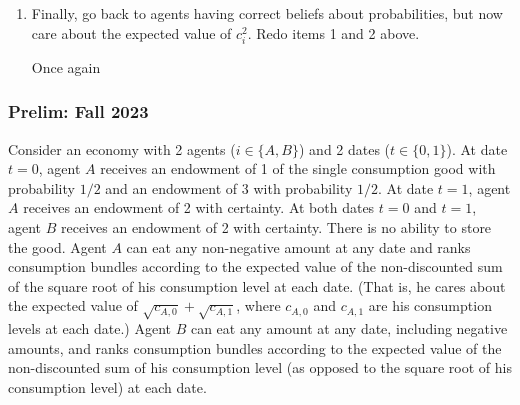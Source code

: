 \documentclass[11pt,english]{article}
\begin{document}
\begin{enumerate}
    \item[(5)] Finally, go back to agents having correct beliefs about
        probabilities, but now care about the expected value of $c_i^2$. Redo
        items 1 and 2 above.
    \begin{solution}
 Once again
    \end{solution}
\end{enumerate}

\subsubsection{Prelim: Fall 2023}\label{Phelan Prelim: Fall 2023}
Consider an economy with 2 agents ($i \in \{A, B\}$) and 2 dates ($t \in
\{0, 1\}$). At date $t = 0$, agent $A$ receives an endowment of 1 of the
single consumption good with probability $1/2$ and an endowment of 3 with
probability $1/2$. At date $t = 1$, agent $A$ receives an endowment of 2 with
certainty. At both dates $t = 0$ and $t = 1$, agent $B$ receives an endowment
of 2 with certainty. There is no ability to store the good. Agent $A$ can eat
any non-negative amount at any date and ranks consumption bundles according to
the expected value of the non-discounted sum of the square root of his
consumption level at each date. (That is, he cares about the expected value of
$\sqrt{c_{A,0}} + \sqrt{c_{A,1}}$, where $c_{A,0}$ and $c_{A,1}$ are his
consumption levels at each date.) Agent $B$ can eat any amount at any date,
including negative amounts, and ranks consumption bundles according to the
expected value of the non-discounted sum of his consumption level (as opposed
to the square root of his consumption level) at each date.
 
\end{document}
